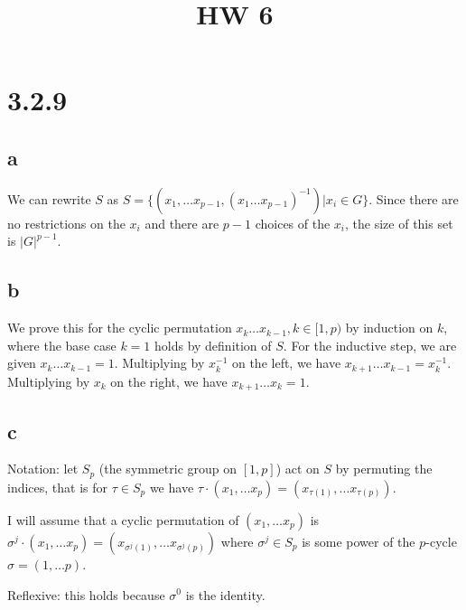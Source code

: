 \documentclass{article}
\title{HW 6}
\date{}
\def\inv{{-1}}
\begin{document}
\maketitle







\section*{3.2.9}

\subsection*{a}

We can rewrite $S$ as $S = \{(x_1, \ldots x_{p-1}, (x_1 \ldots x_{p-1})^\inv) | x_i \in G\}$. Since there are no restrictions on the $x_i$ and there are $p-1$ choices of the $x_i$, the size of this set is $|G|^{p-1}$.

\subsection*{b}

We prove this for the cyclic permutation $x_k \ldots x_{k-1}, k \in [1, p)$ by induction on $k$, where the base case $k=1$ holds by definition of $S$. For the inductive step, we are given $x_k \ldots x_{k-1} = 1$. Multiplying by $x_k^\inv$ on the left, we have $x_{k+1} \ldots x_{k-1} = x_k^\inv$. Multiplying by $x_k$ on the right, we have $x_{k+1} \ldots x_{k} = 1$.

\subsection*{c}

Notation: let $S_p$ (the symmetric group on $[1, p]$) act on $S$ by permuting the indices, that is for $\tau \in S_p$ we have $\tau \cdot (x_1, \ldots x_p) = (x_{\tau(1)}, \ldots x_{\tau(p)})$.

I will assume that a cyclic permutation of $(x_1, \ldots x_p)$ is $\sigma^j \cdot (x_1, \ldots x_p) = (x_{\sigma^j(1)}, \ldots x_{\sigma^j(p)})$ where $\sigma^j \in S_p$ is some power of the $p$-cycle $\sigma = (1, \ldots p)$.


Reflexive: this holds because $\sigma^0$ is the identity.
\end{document}
